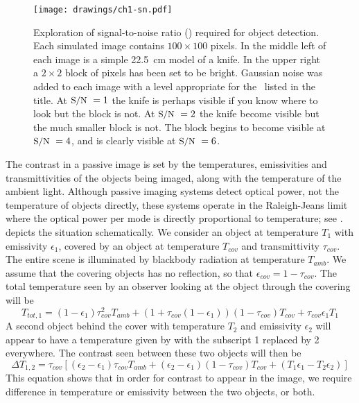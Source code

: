 \begin{figure}
\centering
\texttt{[image: drawings/ch1-sn.pdf]}
\caption[Signal-to-noise ratio for object detection]{
  Exploration of signal-to-noise ratio (\SN) required for object detection.
  Each simulated image contains $100 \times 100$ pixels.
  In the middle left of each image is a simple \SI{22.5}{\cm} model of a knife.
  In the upper right a $2\times2$ block of pixels has been set to be bright.
  Gaussian noise was added to each image with a level appropriate for the \SN\ listed in the title.
  At $\text{\small{S/N}}\ = 1$ the knife is perhaps visible if you know where to look but the block is not.
  At $\text{\small{S/N}}\ = 2$ the knife become visible but the much smaller block is not.
  The block begins to become visible at $\text{\small{S/N}}\ = 4$, and is clearly visible at $\text{\small{S/N}}\ = 6$.
}
\label{fig:ch1-sn}
\end{figure}

The contrast in a passive image is set by the temperatures, emissivities and transmittivities of the objects being imaged, along with the temperature of the ambient light.
Although passive imaging systems detect optical power, not the temperature of objects directly, these systems operate in the Raleigh-Jeans limit where the optical power per mode is directly proportional to temperature; see .
 depicts the situation schematically.
We consider an object at temperature $T_{1}$ with emissivity $\epsilon_1$, covered by an object at temperature $T_{cov}$ and transmittivity $\tau_{cov}$.
The entire scene is illuminated by blackbody radiation at temperature $T_{amb}$.
We assume that the covering objects has no reflection, so that $\epsilon_{cov} = 1 - \tau_{cov}$.
The total temperature seen by an observer looking at the object through the covering will be
\begin{equation} \label{eqn:ch1-t-tot}
  T_{tot,1} = (1 - \epsilon_{1}) \tau_{cov}^2 T_{amb} + 
           (1 + \tau_{cov}(1 - \epsilon_{1}))(1-\tau_{cov}) T_{cov} + 
           \tau_{cov} \epsilon_{1} T_1
\end{equation}
A second object behind the cover with temperature $T_2$ and emissivity $\epsilon_2$ will appear to have a temperature given by  with the subscript 1 replaced by 2 everywhere.
The contrast seen between these two objects will then be
\begin{equation} \label{eqn:ch1-delta-t}
  \Delta T_{1,2} = \tau_{cov} \left[ (\epsilon_2 - \epsilon_1) \tau_{cov} T_{amb} + 
                                    (\epsilon_2 - \epsilon_1) (1-\tau_{cov}) T_{cov} + 
                                    (T_1 \epsilon_1 - T_2 \epsilon_2) \right]
\end{equation}
This equation shows that in order for contrast to appear in the image, we require difference in temperature or emissivity between the two objects, or both.

